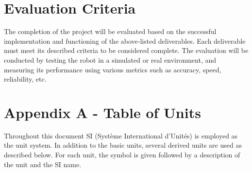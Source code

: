 \documentclass[12pt]{article}
\begin{document}
\section{Evaluation Criteria}
The completion of the project will be evaluated based on the successful implementation and functioning of the above-listed deliverables. Each deliverable must meet its described criteria to be considered complete. The evaluation will be conducted by testing the robot in a simulated or real environment, and measuring its performance using various metrics such as accuracy, speed, reliability, etc.

\newpage
\section{Appendix A - Table of Units}
Throughout this document SI (Syst\`{e}me International d'Unit\'{e}s) is employed
as the unit system.  In addition to the basic units, several derived units are
used as described below.  For each unit, the symbol is given followed by a
description of the unit and the SI name.
~\newline
\end{document}
